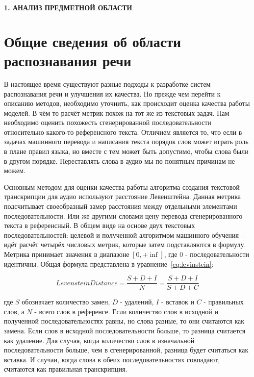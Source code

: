 \newpage
\begin{center}
  \textbf{\large 1. АНАЛИЗ ПРЕДМЕТНОЙ ОБЛАСТИ}
\end{center}


\section{Общие сведения об области распознавания речи}

В настоящее время существуют разные подходы к разработке систем распознавания речи и улучшения их качества\cite{toshniwal2018comparison, lei2023acoustic, tang2023salmonn}.
Но прежде чем перейти к описанию методов, необходимо уточнить, как происходит оценка качества работы моделей.
В чём-то расчёт метрик похож на тот же из текстовых задач.
Нам необходимо оценить похожесть сгенерированной последовательности относительно какого-то референсного текста.
Отличием является то, что если в задачах машинного перевода и написания текста порядок слов может играть роль в плане правил языка, но вместе с тем может быть допустимо, чтобы слова были в другом порядке.
Переставлять слова в аудио мы по понятным причинам не можем.

Основным методом для оценки качества работы алгоритма создания текстовой транскрипции для аудио используют расстояние Левенштейна\cite{levenshtein1966binary, niessen2000evaluation}.
Данная метрика подсчитывает своеобразный замер расстояния между отдельными элементами последовательности.
Или же другими словами цену перевода сгенерированного текста в референсный.
В общем виде на основе двух текстовых последовательностей: целевой и полученной алгоритмом машинного обучения -- идёт расчёт четырёх числовых метрик, которые затем подставляются в формулу.
Метрика принимает значения в диапазоне $[0, +\inf]$, где 0 - последовательности идентичны.
Общая формула представлена в уравнение~\ref{eq:levinstein}:

\begin{equation}
  Levenstein Distance = \frac{S + D + I}{N} = \frac{S + D + I}{S + D + C}
  \label{eq:levinstein}
\end{equation}


где $S$ обозначает количество замен, $D$ - удалений, $I$ - вставок и $C$ - правильных слов, а $N$ - всего слов в референсе. 
Если количество слов в исходной и полученной последовательностях равны, но слова разные, то они считаются как замена. 
Если слов в исходной последовательности больше, то разница считается как удаление.
Для случая, когда количество слов в изначальной последовательности больше, чем в сгенерированной, разница будет считаться как вставка.
И случаи, когда слова в обеих последовательностях совпадают, считаются как правильная транскрипция.

